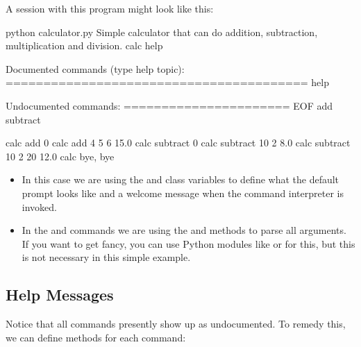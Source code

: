 A session with this program might look like this:

\begin{sphinxVerbatim}[commandchars=\\\{\}]
\PYGZdl{} python calculator.py
Simple calculator that can do addition, subtraction, multiplication and division.
calc \PYGZgt{}\PYGZgt{}\PYGZgt{} help

Documented commands (type help \PYGZlt{}topic\PYGZgt{}):
========================================
help

Undocumented commands:
======================
EOF  add  subtract

calc \PYGZgt{}\PYGZgt{}\PYGZgt{} add
0
calc \PYGZgt{}\PYGZgt{}\PYGZgt{} add 4 5 6
15.0
calc \PYGZgt{}\PYGZgt{}\PYGZgt{} subtract
0
calc \PYGZgt{}\PYGZgt{}\PYGZgt{} subtract 10 2
8.0
calc \PYGZgt{}\PYGZgt{}\PYGZgt{} subtract 10 2 20
\PYGZhy{}12.0
calc \PYGZgt{}\PYGZgt{}\PYGZgt{} bye, bye
\end{sphinxVerbatim}
\begin{itemize}
\item {} 
In this case we are using the  and  class variables
to define what the default prompt looks like and a welcome message
when the command interpreter is invoked.

\item {} 
In the  and  commands we are using the  and
 methods to parse all arguments. If you want to get fancy,
you can use Python modules like  or  for this,
but this is not necessary in this simple example.

\end{itemize}


\subsection{Help Messages}
\label{\detokenize{lesson/prg/python_cmd:help-messages}}
Notice that all commands presently show up as undocumented. To remedy
this, we can define  methods for each command:

